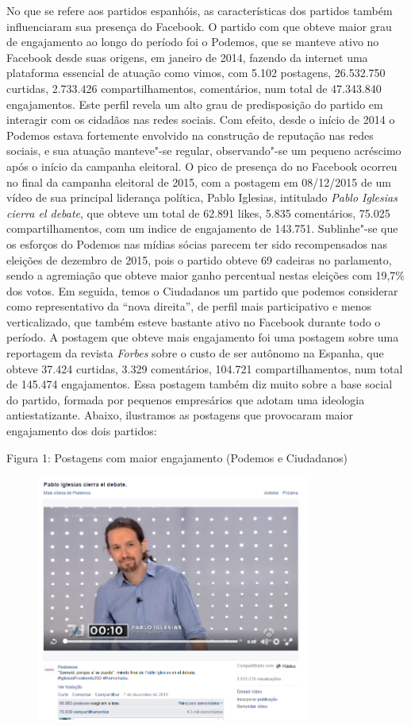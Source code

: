 No que se refere aos partidos espanhóis, as características dos partidos
também influenciaram sua presença do Facebook. O partido com que obteve
maior grau de engajamento ao longo do período foi o Podemos, que se
manteve ativo no Facebook desde suas origens, em janeiro de 2014,
fazendo da internet uma plataforma essencial de atuação como vimos, com
5.102 postagens, 26.532.750 curtidas, 2.733.426 compartilhamentos,
comentários, num total de 47.343.840 engajamentos. Este perfil revela um
alto grau de predisposição do partido em interagir com os cidadãos nas
redes sociais. Com efeito, desde o início de 2014 o Podemos estava
fortemente envolvido na construção de reputação nas redes sociais, e sua
atuação manteve"-se regular, observando"-se um pequeno acréscimo após o
início da campanha eleitoral. O pico de presença do  no Facebook
ocorreu no final da campanha eleitoral de 2015, com a postagem em
08/12/2015 de um vídeo de sua principal liderança política, Pablo
Iglesias, intitulado \emph{Pablo Iglesias cierra el debate}, que obteve
um total de 62.891 likes, 5.835 comentários, 75.025 compartilhamentos,
com um indice de engajamento de 143.751. Sublinhe"-se que os esforços do
Podemos nas mídias sócias parecem ter sido recompensados nas eleições de
dezembro de 2015, pois o partido obteve 69 cadeiras no parlamento, sendo
a agremiação que obteve maior ganho percentual nestas eleições com
19,7\% dos votos. Em seguida, temos o Ciudadanos um partido que podemos
considerar como representativo da ``nova direita'', de perfil mais
participativo e menos verticalizado, que também esteve bastante ativo no
Facebook durante todo o período. A postagem que obteve mais engajamento
foi uma postagem sobre uma reportagem da revista \emph{Forbes} sobre o
custo de ser autônomo na Espanha, que obteve 37.424 curtidas, 3.329
comentários, 104.721 compartilhamentos, num total de 145.474
engajamentos. Essa postagem também diz muito sobre a base social do
partido, formada por pequenos empresários que adotam uma ideologia
antiestatizante. Abaixo, ilustramos as postagens que provocaram maior
engajamento dos dois partidos:

Figura 1: Postagens com maior engajamento (Podemos e Ciudadanos)

\begin{figure}[!ht]
\centering
 \includegraphics[width=90mm]{./imgs/fig1.png}
\end{figure}


